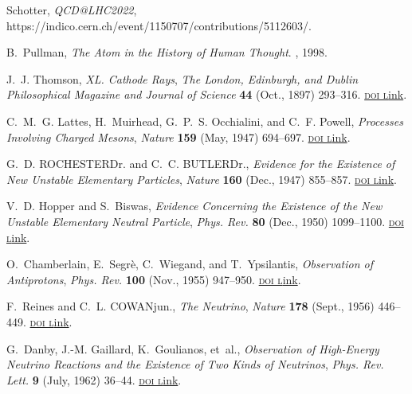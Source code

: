 \documentclass[ALICE,manyauthors]{cernphprep}
\begin{document}
\begin{thebibliography}{100}
{Schotter}, {\it {{QCD}}@{{LHC2022}}},
  https://indico.cern.ch/event/1150707/contributions/5112603/.

B.~Pullman, {\em The Atom in the History of Human Thought}.
, 1998.

J.~J. Thomson, {\it {{XL}}. {{Cathode Rays}}},  {\textsl{The London, Edinburgh,
  and Dublin Philosophical Magazine and Journal of Science}} {\footnotesize \bf
  44} (Oct., 1897) 293--316.
  \href{http://dx.doi.org/10.1080/14786449708621070}{\footnotesize
  \textrm{\textsc{doi l}ink}}.

C.~M.~G. Lattes, H.~Muirhead, G.~P.~S. Occhialini, and C.~F. Powell, {\it
  Processes {{Involving Charged Mesons}}},  {\textsl{Nature}} {\footnotesize
  \bf 159} (May, 1947) 694--697.
  \href{http://dx.doi.org/10.1038/159694a0}{\footnotesize \textrm{\textsc{doi
  l}ink}}.

G.~D. ROCHESTERDr. and C.~C. BUTLERDr., {\it Evidence for the {{Existence}} of
  {{New Unstable Elementary Particles}}},  {\textsl{Nature}} {\footnotesize \bf
  160} (Dec., 1947) 855--857.
  \href{http://dx.doi.org/10.1038/160855a0}{\footnotesize \textrm{\textsc{doi
  l}ink}}.

V.~D. Hopper and S.~Biswas, {\it Evidence {{Concerning}} the {{Existence}} of
  the {{New Unstable Elementary Neutral Particle}}},  {\textsl{Phys. Rev.}}
  {\footnotesize \bf 80} (Dec., 1950) 1099--1100.
  \href{http://dx.doi.org/10.1103/PhysRev.80.1099}{\footnotesize
  \textrm{\textsc{doi l}ink}}.

O.~Chamberlain, E.~Segr{\`e}, C.~Wiegand, and T.~Ypsilantis, {\it Observation
  of {{Antiprotons}}},  {\textsl{Phys. Rev.}} {\footnotesize \bf 100} (Nov.,
  1955) 947--950.
  \href{http://dx.doi.org/10.1103/PhysRev.100.947}{\footnotesize
  \textrm{\textsc{doi l}ink}}.

F.~Reines and C.~L. COWANjun., {\it The {{Neutrino}}},  {\textsl{Nature}}
  {\footnotesize \bf 178} (Sept., 1956) 446--449.
  \href{http://dx.doi.org/10.1038/178446a0}{\footnotesize \textrm{\textsc{doi
  l}ink}}.

G.~Danby, J.-M. Gaillard, K.~Goulianos, et~al., {\it Observation of
  {{High-Energy Neutrino Reactions}} and the {{Existence}} of {{Two Kinds}} of
  {{Neutrinos}}},  {\textsl{Phys. Rev. Lett.}} {\footnotesize \bf 9} (July,
  1962) 36--44. \href{http://dx.doi.org/10.1103/PhysRevLett.9.36}{\footnotesize
  \textrm{\textsc{doi l}ink}}.


\end{thebibliography}
\end{document}
